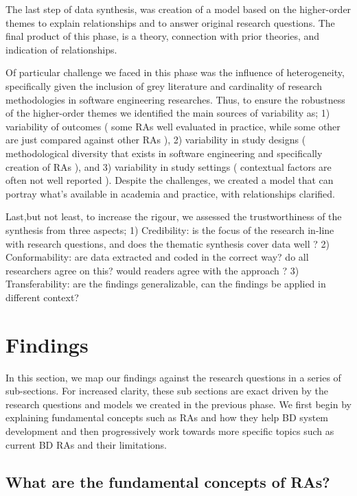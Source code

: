 \documentclass[review]{elsarticle}
\begin{document}
The last step of data synthesis, was creation of a model based on the higher-order themes to explain relationships and to answer original research questions. The final product of this phase, is a theory, connection with prior theories, and indication of relationships. 

Of particular challenge we faced in this phase was the influence of heterogeneity, specifically given the inclusion of grey literature and cardinality of research methodologies in software engineering researches. Thus, to ensure the robustness of the higher-order themes we identified the main sources of variability as; 1) variability of outcomes ( some RAs well evaluated in practice, while some other are just compared against other RAs ), 2) variability in study designs ( methodological diversity that exists in software engineering and specifically creation of RAs ), and 3) variability in study settings ( contextual factors are often not well reported ). Despite the challenges, we created a model that can portray what's available in academia and practice, with relationships clarified. 

Last,but not least, to increase the rigour, we assessed the trustworthiness of the synthesis from three aspects; 1) Credibility: is the focus of the research in-line with research questions, and does the thematic synthesis cover data well ? 2) Conformability: are data extracted and coded in the correct way? do all researchers agree on this? would readers agree with the approach ? 3) Transferability: are the findings generalizable, can the findings be applied in different context? 

\section{Findings}

In this section, we map our findings against the research questions in a series of sub-sections. For increased clarity, these sub sections are exact driven by the research questions and models we created in the previous phase. We first begin by explaining fundamental concepts such as RAs and how they help BD system development and then progressively work towards more specific topics such as current BD RAs and their limitations.

\subsection{What are the fundamental concepts of RAs?}
\end{document}
